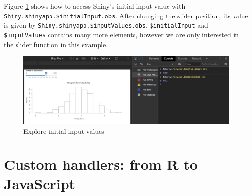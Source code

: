 \documentclass[]{book}
\newenvironment{Shaded}{\begin{snugshade}}{\end{snugshade}}
\newcommand{\ControlFlowTok}[1]{\textcolor[rgb]{0.13,0.29,0.53}{\textbf{#1}}}
\newcommand{\DataTypeTok}[1]{\textcolor[rgb]{0.13,0.29,0.53}{#1}}
\newcommand{\DecValTok}[1]{\textcolor[rgb]{0.00,0.00,0.81}{#1}}
\newcommand{\KeywordTok}[1]{\textcolor[rgb]{0.13,0.29,0.53}{\textbf{#1}}}
\newcommand{\NormalTok}[1]{#1}
\newcommand{\OperatorTok}[1]{\textcolor[rgb]{0.81,0.36,0.00}{\textbf{#1}}}
\newcommand{\StringTok}[1]{\textcolor[rgb]{0.31,0.60,0.02}{#1}}
\begin{document}
\begin{Shaded}
\end{Shaded}

Figure \ref{fig:shiny-initial-inputs} shows how to access Shiny's initial input value with \texttt{Shiny.shinyapp.\$initialInput.obs}. After changing the slider position, its value is given by \texttt{Shiny.shinyapp.\$inputValues.obs}. \texttt{\$initialInput} and \texttt{\$inputValues} contains many more elements, however we are only interested in the slider function in this example.

\begin{figure}
\includegraphics[width=27.61in]{images/survival-kit/shiny-init-input} \caption{Explore initial input values}\label{fig:shiny-initial-inputs}
\end{figure}

\hypertarget{custom-handlers-from-r-to-javascript}{%
\section{Custom handlers: from R to JavaScript}\label{custom-handlers-from-r-to-javascript}}
\end{document}
